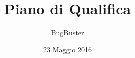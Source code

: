 



\title{\textbf{Piano di Qualifica}}
\author{BugBuster}

\date{23 Maggio 2016}




\makeFrontPage

\tableofcontents
\listoffigures
\listoftables





